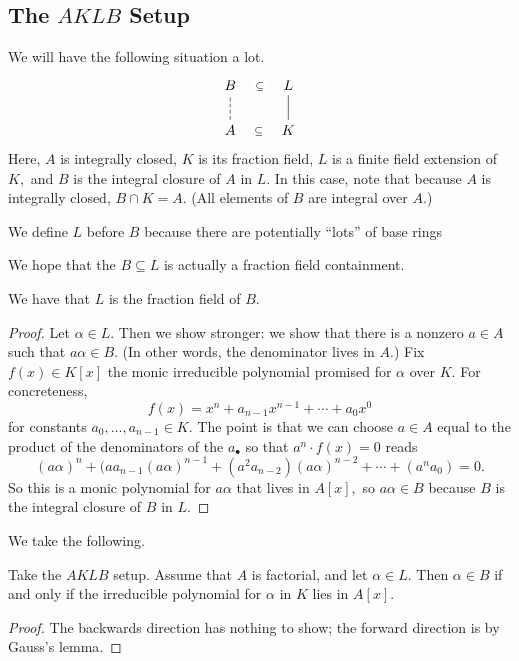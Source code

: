 \documentclass[../notes.tex]{subfiles}
\begin{document}
\subsection{The \texorpdfstring{$AKLB$}{} Setup}
We will have the following situation a lot.
\[\begin{tikzcd}
	B & L \\
	A & K
	\arrow[no head, from=2-2, to=1-2]
	\arrow["\subseteq"{description}, draw=none, from=2-1, to=2-2]
	\arrow["\subseteq"{description}, draw=none, from=1-1, to=1-2]
	\arrow[dashed, no head, from=2-1, to=1-1]
\end{tikzcd}\]
Here, $A$ is integrally closed, $K$ is its fraction field, $L$ is a finite field extension of $K,$ and $B$ is the integral closure of $A$ in $L.$ In this case, note that because $A$ is integrally closed, $B\cap K=A.$ (All elements of $B$ are integral over $A.$)
\begin{remark}
    We define $L$ before $B$ because there are potentially ``lots'' of base rings 
\end{remark}

We hope that the $B\subseteq L$ is actually a fraction field containment.
\begin{prop}
    We have that $L$ is the fraction field of $B.$
\end{prop}
\begin{proof}
    Let $\alpha\in L.$ Then we show stronger: we show that there is a nonzero $a\in A$ such that $a\alpha\in B.$ (In other words, the denominator lives in $A.$) Fix $f(x)\in K[x]$ the monic irreducible polynomial promised for $\alpha$ over $K.$ For concreteness,
    \[f(x)=x^n+a_{n-1}x^{n-1}+\cdots+a_0x^0\]
    for constants $a_0,\ldots,a_{n-1}\in K.$ The point is that we can choose $a\in A$ equal to the product of the denominators of the $a_\bullet$ so that $a^n\cdot f(x)=0$ reads
    \[(a\alpha)^n+(aa_{n-1}(a\alpha)^{n-1}+(a^2a_{n-2})(a\alpha)^{n-2}+\cdots+(a^na_0)=0.\]
    So this is a monic polynomial for $a\alpha$ that lives in $A[x],$ so $a\alpha\in B$ because $B$ is the integral closure of $B$ in $L.$
\end{proof}
We take the following.
\begin{prop}
    Take the $AKLB$ setup. Assume that $A$ is factorial, and let $\alpha\in L.$ Then $\alpha\in B$ if and only if the irreducible polynomial for $\alpha$ in $K$ lies in $A[x].$
\end{prop}
\begin{proof}
    The backwards direction has nothing to show; the forward direction is by Gauss's lemma.\todo{}
\end{proof}
\end{document}
